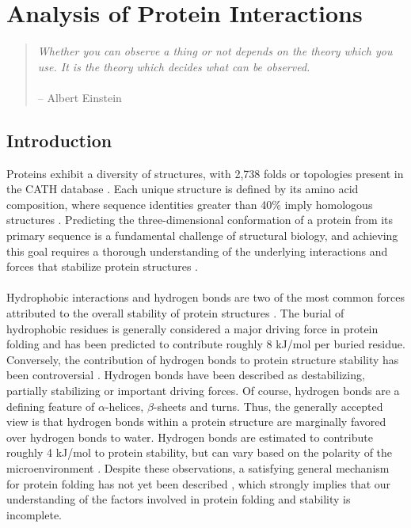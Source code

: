 
\chapter{Analysis of Protein \npistar{} Interactions}

\begin{quote}
{\it
  Whether you can observe a thing or not depends on the theory which you use.
  It is the theory which decides what can be observed.}
\\\\
 -- Albert Einstein
\end{quote}

\section{Introduction}

\begin{doublespace}
Proteins exhibit a diversity of structures, with 2,738 folds or topologies
present in the CATH database \cite{knudsen:hugen2010}. Each unique
structure is defined by its amino acid composition, where sequence identities
greater than 40\% imply homologous structures \cite{rost:proteng1999}.
Predicting the three-dimensional conformation of a protein from its primary
sequence is a fundamental challenge of structural biology, and achieving this
goal requires a thorough understanding of the underlying interactions and
forces that stabilize protein structures \cite{zhang:opin2008}.
\\\\
Hydrophobic interactions and hydrogen bonds are two of the most common forces
attributed to the overall stability of protein structures
\cite{robertson:chemrev1997,dill:bioc1990}. The burial of hydrophobic
residues is generally considered a major driving force in protein folding
\cite{kauzmann:apc1959} and has been predicted to contribute roughly
8 kJ/mol per buried residue. Conversely, the contribution of hydrogen bonds to
protein structure stability has been controversial
\cite{pace:nsmb2009}. Hydrogen bonds have been described as
destabilizing, partially stabilizing or important driving forces. Of course,
hydrogen bonds are a defining feature of $\alpha$-helices, $\beta$-sheets and
turns. Thus, the generally accepted view is that hydrogen bonds within a
protein structure are marginally favored over hydrogen bonds to water.
Hydrogen bonds are estimated to contribute roughly 4 kJ/mol to protein
stability, but can vary based on the polarity of the microenvironment
\cite{gao:nsmb2009}. Despite these observations, a satisfying
general mechanism for protein folding has not yet been described
\cite{shakhnovich:pnas2009,shaw:sci2010}, which strongly implies
that our understanding of the factors involved in protein folding and stability
is incomplete.
\end{doublespace}

